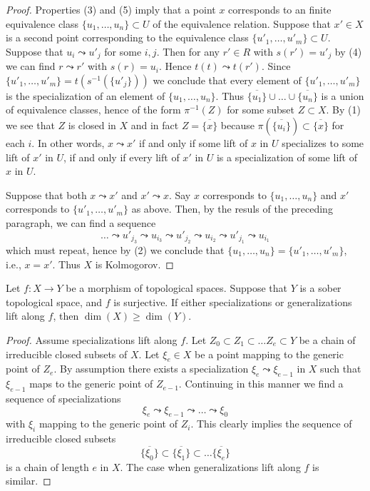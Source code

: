 \begin{proof}
Properties (3) and (5) imply that a point $x$ corresponds to an
finite equivalence class $\{u_1, \ldots, u_n\} \subset U$ of the equivalence
relation. Suppose that $x' \in X$ is a second point corresponding to
the equivalence class $\{u'_1, \ldots, u'_m\} \subset U$.
Suppose that $u_i \leadsto u'_j$ for some $i, j$. Then for any
$r' \in R$ with $s(r') = u'_j$ by (4) we can find $r \leadsto r'$
with $s(r) = u_i$. Hence $t(t) \leadsto t(r')$. Since
$\{u'_1, \ldots, u'_m\} = t(s^{-1}(\{u'_j\}))$ we conclude that
every element of $\{u'_1, \ldots, u'_m\}$ is the specialization of
an element of $\{u_1, \ldots, u_n\}$.
Thus $\overline{\{u_1\}} \cup \ldots \cup \overline{\{u_n\}}$ is
a union of equivalence classes, hence of the form $\pi^{-1}(Z)$
for some subset $Z \subset X$. By (1) we see that $Z$ is closed in $X$
and in fact $Z = \overline{\{x\}}$ because $\pi(\overline{\{u_i\}})
\subset \overline{\{x\}}$ for each $i$. In other words, $x \leadsto x'$
if and only if some lift of $x$ in $U$ specializes to some lift of
$x'$ in $U$, if and only if every lift of $x'$ in $U$ is a specialization
of some lift of $x$ in $U$.

\medskip\noindent
Suppose that both $x \leadsto x'$ and $x' \leadsto x$. Say $x$ corresponds
to $\{u_1, \ldots, u_n\}$ and $x'$ corresponds to $\{u'_1, \ldots, u'_m\}$
as above. Then, by the resuls of the preceding paragraph, we can find a
sequence
$$
\ldots \leadsto u'_{j_3} \leadsto u_{i_3} \leadsto u'_{j_2} \leadsto
u_{i_2} \leadsto u'_{j_1} \leadsto u_{i_1}
$$
which must repeat, hence by (2) we conclude that
$\{u_1, \ldots, u_n\} = \{u'_1, \ldots, u'_m\}$, i.e., $x = x'$.
Thus $X$ is Kolmogorov.
\end{proof}


\begin{lemma}
\label{lemma-dimension-specializations-lift}
Let $f : X \to Y$ be a morphism of topological spaces.
Suppose that $Y$ is a sober topological space, and $f$ is surjective.
If either specializations or generalizations lift along $f$, then
$\dim(X) \geq \dim(Y)$.
\end{lemma}

\begin{proof}
Assume specializations lift along $f$.
Let $Z_0 \subset Z_1 \subset \ldots Z_e \subset Y$ be a chain
of irreducible closed subsets of $X$. Let $\xi_e \in X$ be a point
mapping to the generic point of $Z_e$. By assumption there
exists a specialization
$\xi_e \leadsto \xi_{e - 1}$ in $X$ such that $\xi_{e - 1}$ maps to
the generic point of $Z_{e - 1}$. Continuing in this manner we find
a sequence of specializations
$$
\xi_e \leadsto \xi_{e - 1} \leadsto \ldots \leadsto \xi_0
$$
with $\xi_i$ mapping to the generic point of $Z_i$.
This clearly implies the sequence of irreducible closed
subsets
$$
\overline{\{\xi_0\}} \subset
\overline{\{\xi_1\}} \subset \ldots
\overline{\{\xi_e\}}
$$
is a chain of length $e$ in $X$.
The case when generalizations lift along $f$ is similar.
\end{proof}

